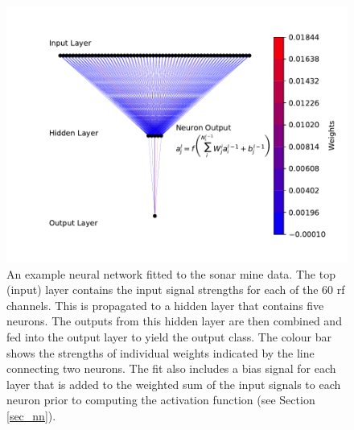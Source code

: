 \documentclass[10pt]{article}
\begin{document}
\begin{figure}
\begin{center}
\includegraphics[scale=1.3,angle=0,trim=3.5cm 1cm 0cm 0cm]{nnplot_0_1.pdf}
\caption{An example neural network fitted to the sonar mine data. The top (input) layer contains the input signal strengths for each of the 60 rf channels. This is propagated to a hidden layer that contains five neurons. The outputs from this hidden layer are then combined and fed into the output layer to yield the output class. The colour bar shows the strengths of individual weights indicated by the line connecting two neurons. The fit also includes a bias signal for each layer that is added to the weighted sum of the input signals to each neuron prior to computing the activation function (see Section \ref{sec_nn}).}
\label{fig0}
\end{center}
\end{figure} 
\end{document}
